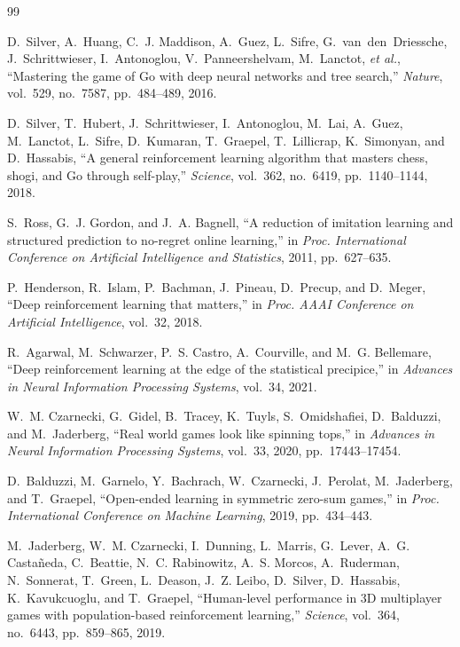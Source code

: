 \documentclass[conference]{IEEEtran}
\newcommand{\etal}{\textit{et al.}}
\begin{document}
\begin{thebibliography}{99}

D.~Silver, A.~Huang, C.~J. Maddison, A.~Guez, L.~Sifre, G.~van~den~Driessche, J.~Schrittwieser, I.~Antonoglou, V.~Panneershelvam, M.~Lanctot, \etal, ``Mastering the game of Go with deep neural networks and tree search,'' \emph{Nature}, vol.~529, no.~7587, pp.~484--489, 2016.

D.~Silver, T.~Hubert, J.~Schrittwieser, I.~Antonoglou, M.~Lai, A.~Guez, M.~Lanctot, L.~Sifre, D.~Kumaran, T.~Graepel, T.~Lillicrap, K.~Simonyan, and D.~Hassabis, ``A general reinforcement learning algorithm that masters chess, shogi, and Go through self-play,'' \emph{Science}, vol.~362, no.~6419, pp.~1140--1144, 2018.

S.~Ross, G.~J. Gordon, and J.~A. Bagnell, ``A reduction of imitation learning and structured prediction to no-regret online learning,'' in \emph{Proc. International Conference on Artificial Intelligence and Statistics}, 2011, pp.~627--635.

P.~Henderson, R.~Islam, P.~Bachman, J.~Pineau, D.~Precup, and D.~Meger, ``Deep reinforcement learning that matters,'' in \emph{Proc. AAAI Conference on Artificial Intelligence}, vol.~32, 2018.

R.~Agarwal, M.~Schwarzer, P.~S. Castro, A.~Courville, and M.~G. Bellemare, ``Deep reinforcement learning at the edge of the statistical precipice,'' in \emph{Advances in Neural Information Processing Systems}, vol.~34, 2021.

W.~M. Czarnecki, G.~Gidel, B.~Tracey, K.~Tuyls, S.~Omidshafiei, D.~Balduzzi, and M.~Jaderberg, ``Real world games look like spinning tops,'' in \emph{Advances in Neural Information Processing Systems}, vol.~33, 2020, pp.~17443--17454.

D.~Balduzzi, M.~Garnelo, Y.~Bachrach, W.~Czarnecki, J.~Perolat, M.~Jaderberg, and T.~Graepel, ``Open-ended learning in symmetric zero-sum games,'' in \emph{Proc. International Conference on Machine Learning}, 2019, pp.~434--443.

M.~Jaderberg, W.~M. Czarnecki, I.~Dunning, L.~Marris, G.~Lever, A.~G. Casta\~{n}eda, C.~Beattie, N.~C. Rabinowitz, A.~S. Morcos, A.~Ruderman, N.~Sonnerat, T.~Green, L.~Deason, J.~Z. Leibo, D.~Silver, D.~Hassabis, K.~Kavukcuoglu, and T.~Graepel, ``Human-level performance in 3D multiplayer games with population-based reinforcement learning,'' \emph{Science}, vol.~364, no.~6443, pp.~859--865, 2019.


\end{thebibliography}
\end{document}
